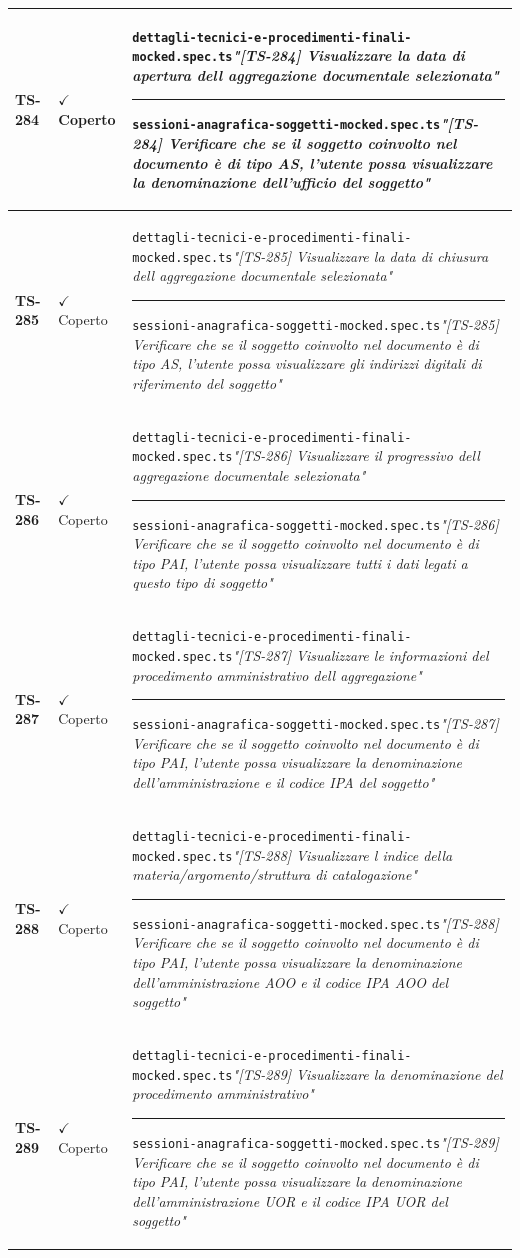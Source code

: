 \documentclass[a4paper,12pt]{article}
\newcommand{\ok}{\textcolor{green!60!black}{$\checkmark$ Coperto}}
\newcommand{\f}[1]{\nolinkurl{#1}\newline}
\newcommand{\q}[1]{\textit{#1}}
\newcommand{\sep}{\newline \vspace{2mm} \hrule \vspace{2mm}}
\begin{document}
\begin{longtable}{|p{1.5cm}|p{3.0cm}|p{10.5cm}|}
\textbf{TS-284} & \ok & \f{dettagli-tecnici-e-procedimenti-finali-mocked.spec.ts}\q{"[TS-284] Visualizzare la data di apertura dell aggregazione documentale selezionata"} \sep \f{sessioni-anagrafica-soggetti-mocked.spec.ts}\q{"[TS-284] Verificare che se il soggetto coinvolto nel documento è di tipo AS, l'utente possa visualizzare la denominazione dell'ufficio del soggetto"} \\ \hline
\textbf{TS-285} & \ok & \f{dettagli-tecnici-e-procedimenti-finali-mocked.spec.ts}\q{"[TS-285] Visualizzare la data di chiusura dell aggregazione documentale selezionata"} \sep \f{sessioni-anagrafica-soggetti-mocked.spec.ts}\q{"[TS-285] Verificare che se il soggetto coinvolto nel documento è di tipo AS, l'utente possa visualizzare gli indirizzi digitali di riferimento del soggetto"} \\ \hline
\textbf{TS-286} & \ok & \f{dettagli-tecnici-e-procedimenti-finali-mocked.spec.ts}\q{"[TS-286] Visualizzare il progressivo dell aggregazione documentale selezionata"} \sep \f{sessioni-anagrafica-soggetti-mocked.spec.ts}\q{"[TS-286] Verificare che se il soggetto coinvolto nel documento è di tipo PAI, l'utente possa visualizzare tutti i dati legati a questo tipo di soggetto"} \\ \hline
\textbf{TS-287} & \ok & \f{dettagli-tecnici-e-procedimenti-finali-mocked.spec.ts}\q{"[TS-287] Visualizzare le informazioni del procedimento amministrativo dell aggregazione"} \sep \f{sessioni-anagrafica-soggetti-mocked.spec.ts}\q{"[TS-287] Verificare che se il soggetto coinvolto nel documento è di tipo PAI, l'utente possa visualizzare la denominazione dell'amministrazione e il codice IPA del soggetto"} \\ \hline
\textbf{TS-288} & \ok & \f{dettagli-tecnici-e-procedimenti-finali-mocked.spec.ts}\q{"[TS-288] Visualizzare l indice della materia/argomento/struttura di catalogazione"} \sep \f{sessioni-anagrafica-soggetti-mocked.spec.ts}\q{"[TS-288] Verificare che se il soggetto coinvolto nel documento è di tipo PAI, l'utente possa visualizzare la denominazione dell'amministrazione AOO e il codice IPA AOO del soggetto"} \\ \hline
\textbf{TS-289} & \ok & \f{dettagli-tecnici-e-procedimenti-finali-mocked.spec.ts}\q{"[TS-289] Visualizzare la denominazione del procedimento amministrativo"} \sep \f{sessioni-anagrafica-soggetti-mocked.spec.ts}\q{"[TS-289] Verificare che se il soggetto coinvolto nel documento è di tipo PAI, l'utente possa visualizzare la denominazione dell'amministrazione UOR e il codice IPA UOR del soggetto"} \\ \hline

\end{longtable}
\end{document}
